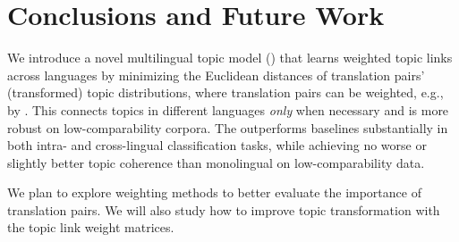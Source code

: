 \section{Conclusions and Future Work}
\label{sec:conclu}

We introduce a novel multilingual topic model (\mtm) that learns weighted topic links across languages by minimizing the Euclidean distances of translation pairs' (transformed) topic distributions, where translation pairs can be weighted, e.g., by \tfidf.
%
This connects topics in different languages \emph{only} when necessary and is more robust on low-comparability corpora.
%
The \mtm outperforms baselines substantially in both intra- and cross-lingual classification tasks, while achieving no worse or slightly better topic coherence than monolingual \lda on low-comparability data.

We plan to explore weighting methods to better evaluate the importance
of translation pairs.
%
We will also study how to improve topic transformation with the topic
link weight matrices.
